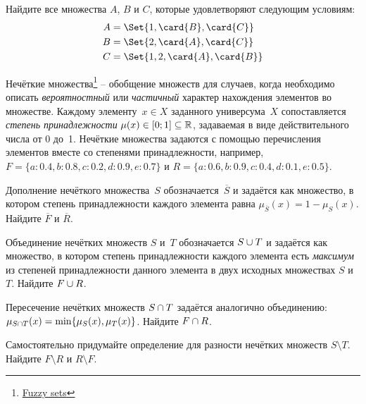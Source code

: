 \documentclass[a4paper,12pt]{article}
\begin{document}
\begin{tasks}


    \item Найдите все множества $A$, $B$ и $C$, которые удовлетворяют следующим условиям:
    \begin{align*}
        A &= \Set{1, \card{B}, \card{C}} \\
        B &= \Set{2, \card{A}, \card{C}} \\
        C &= \Set{1, 2, \card{A}, \card{B}}
    \end{align*}


    \item Нечёткие множества\footnote{\href{https://en.wikipedia.org/wiki/Fuzzy_set}{Fuzzy sets}} \--- обобщение множеств для случаев, когда необходимо описать \textit{вероятностный} или \textit{частичный} характер нахождения элементов во множестве.
    Каждому элементу~$x \in X$ заданного универсума~$X$ сопоставляется \emph{степень принадлежности} $\mu(x) \in [0;1] \subseteq \mathbb{R}$, задаваемая в виде действительного числа от 0 до~1.
    Нечёткие множества задаются с помощью перечисления элементов вместе со степенями принадлежности, например, $F = \{ a:0.4, b:0.8, c:0.2, d:0.9, e:0.7 \}$ и $R = \{ a:0.6, b:0.9, c:0.4, d:0.1, e:0.5 \}$.

    \begin{subtasks}
        \item Дополнение нечёткого множества~$S$ обозначается~$\overline{S}$ и задаётся как множество, в котором степень принадлежности каждого элемента равна $\mu_{\overline{S}}(x) = 1 - \mu_{S}(x)$.
        Найдите $\overline{F}$ и $\overline{R}$.

        \item Объединение нечётких множеств $S$ и~$T$ обозначается $S \cup T$ и задаётся как множество, в котором степень принадлежности каждого элемента есть \emph{максимум} из степеней принадлежности данного элемента в двух исходных множествах $S$ и~$T$.
        Найдите $F \cup R$.

        \item Пересечение нечётких множеств $S \cap T$ задаётся аналогично объединению: $\mu_{S \cap T}(x) = \min\{\mu_{S}(x), \mu_{T}(x)\}$.
        Найдите $F \cap R$.

        \item Самостоятельно придумайте определение для разности нечётких множеств $S \setminus T$.
        Найдите $F \setminus R$ и $R \setminus F$.
    \end{subtasks}



\end{tasks}
\end{document}
